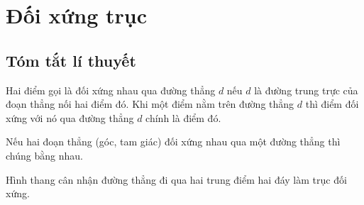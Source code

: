 \section{Đối xứng trục}
\subsection{Tóm tắt lí thuyết}

\begin{dn}
Hai điểm gọi là đối xứng nhau qua đường thẳng $d$ nếu $d$ là đường trung trực của đoạn thẳng nối hai điểm đó. Khi một điểm nằm trên đường thẳng $d$ thì điểm đối xứng với nó qua đường thẳng $d$ chính là điểm đó.
\end{dn}
\begin{dl}
Nếu hai đoạn thẳng (góc, tam giác) đối xứng nhau qua một đường thẳng thì chúng bằng nhau.
\end{dl}

\begin{dl}
Hình thang cân nhận đường thẳng đi qua hai trung điểm hai đáy làm trục đối xứng.
\end{dl}

